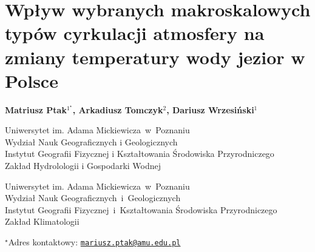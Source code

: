 \documentclass[\main/boa.tex]{subfiles}
\begin{document}
\sloppy


\section{Wpływ wybranych makroskalowych typów cyrkulacji atmosfery na zmiany temperatury wody jezior w Polsce}

\begin{center}
  {\bf {} Matriusz Ptak$^{1^\star}$,   Arkadiusz Tomczyk$^{2}$,  Dariusz Wrzesiński$^{1}$ }
\end{center}

\vskip 0.3cm

\begin{affiliations}
\begin{enumerate}
\begin{minipage}{0.915\textwidth}
\centering
\item Uniwersytet im. Adama Mickiewicza~w~Poznaniu\\ Wydział Nauk Geograficznych i Geologicznych\\ Instytut Geografii Fizycznej i Kształtowania Środowiska Przyrodniczego \\Zakład Hydrolologii i Gospodarki Wodnej
\item Uniwersytet im. Adama Mickiewicza~w~Poznaniu \\ Wydział Nauk Geograficznych~i~Geologicznych  \\ Instytut Geografii Fizycznej~i~Kształtowania Środowiska Przyrodniczego\\
Zakład Klimatologii \\[-2pt]
\end{minipage}
\end{enumerate}
$^\star$Adres kontaktowy: \href{mailto:mariusz.ptak@amu.edu.pl}{\nolinkurl{mariusz.ptak@amu.edu.pl}}\\
\end{affiliations}

\vskip 0.5cm


\vskip 0.5cm
\end{document}
